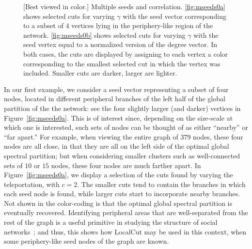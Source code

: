 \documentclass[11pt]{article}
\begin{document}
\begin{figure}[h] 
\caption{[Best viewed in color.]  
Multiple seeds and correlation.
\ref{fig:mseeds0a} shows selected cuts for varying $\gamma$ with the seed 
vector corresponding to a subset of $4$ vertices lying in the periphery-like
region of the network. 
\ref{fig:mseeds0b} shows selected cuts for varying $\gamma$ with the seed 
vertex equal to a normalized version of the degree vector. 
In both cases, the cuts are displayed by assigning to each vertex a color 
corresponding to the smallest selected cut in which the vertex was included. 
Smaller cuts are darker, larger are lighter.  
}
\label{fig:mseeds0}
\end{figure}




In our first example, we consider a seed vector representing a subset of 
four nodes, located in different peripheral branches of the left half of 
the global partition of the the network: 
see the four slightly larger (and darker) vertices in Figure~\ref{fig:mseeds0a}.
This is of interest since, depending on the size-scale at which one is 
interested, such sets of nodes can be thought of as either ``nearby'' or ``far 
apart.''
For example, when viewing the entire graph of $379$ nodes, these 
four nodes are all close, in that they are all on the left side of the 
optimal global spectral partition; but when considering smaller clusters 
such as well-connected sets of $10$ or $15$ nodes, these four nodes are 
much farther apart. 
In Figure~\ref{fig:mseeds0a}, we display a selection of the cuts found by 
varying the teleportation, with $c=2$. 
The smaller cuts tend to contain the branches in which each seed node is 
found, while larger cuts start to incorporate nearby branches. 
Not shown in the color-coding is that the optimal global spectral 
partition is eventually recovered.
Identifying peripheral areas that are well-separated from the rest of the 
graph is a useful primitive in studying the structure of social 
networks~\cite{LLDM08_communities_CONF,LLDM09_communities_IM,LLM10_communities_CONF}; 
and thus, this shows how \textsf{LocalCut} may be used in this context, when 
some periphery-like seed nodes of the graph are known.
\end{document}
